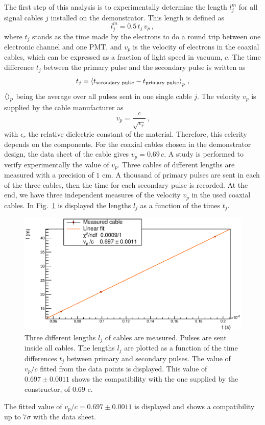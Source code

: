 The first step of this analysis is to experimentally determine the length $l_{j}^{m}$ for all signal cables $j$ installed on the demonstrator.
This length is defined as
\begin{equation}
  l_{j}^{m}= 0.5\,t_{j}\,v_{p}\, ,
\end{equation}
where $t_{j}$ stands as the time made by the electrons to do a round trip between one electronic channel and one PMT, and $v_{p}$ is the velocity of electrons in the coaxial cables, which can be expressed as a fraction of light speed in vacuum, $c$.
The time difference $t_{j}$ between the primary pulse and the secondary pulse is written as
\begin{equation}
  t_{j} = \braket{t_{\text{secondary pulse}}-t_{\text{primary pulse}}}_{p} \, \text{,}
\end{equation}
$\braket{}_{p}$ being the average over all pulses sent in one single cable $j$.
The velocity $v_{p}$ is supplied by the cable manufacturer as
\begin{equation*}
  v_{p}=\frac{c}{\sqrt{\epsilon_{r}}}\,\text{,}
\end{equation*}
with $\epsilon_{r}$ the relative dielectric constant of the material.
Therefore, this celerity depends on the components.
For the coaxial cables chosen in the demonstrator design, the data sheet of the cable gives ${v_{p}=0.69\,c}$.
A study is performed to verify experimentally the value of $v_{p}$.
Three cables of different lengths are measured with a precision of $1$ cm.
A thousand of primary pulses are sent in each of the three cables, then the time for each secondary pulse is recorded.
At the end, we have three independent measures of the velocity $v_{p}$ in the used coaxial cables.
In Fig.~\ref{fig:celerity} is displayed the lengths $l_{j}$ as a function of the times $t_{j}$.
\begin{figure}[h]
  \centering
  \includegraphics[width=15cm]{commissioning/fig_commissioning/celerity.eps}
  \caption{Three different lengths $l_{j}$ of cables are measured.
    Pulses are sent inside all cables.
    The lengths $l_{j}$ are plotted as a function of the time differences $t_{j}$ between primary and secondary pulses.
    The value of $v_{p}/c$ fitted from the data points is displayed.
    This value of $0.697\pm 0.0011$ shows the compatibility with the one supplied by the constructor, of $0.69$ c.
    \label{fig:celerity}}
\end{figure}
The fitted value of $v_{p}/c = 0.697\pm 0.0011$ is displayed and shows a compatibility up to $7\sigma$ with the data sheet.

